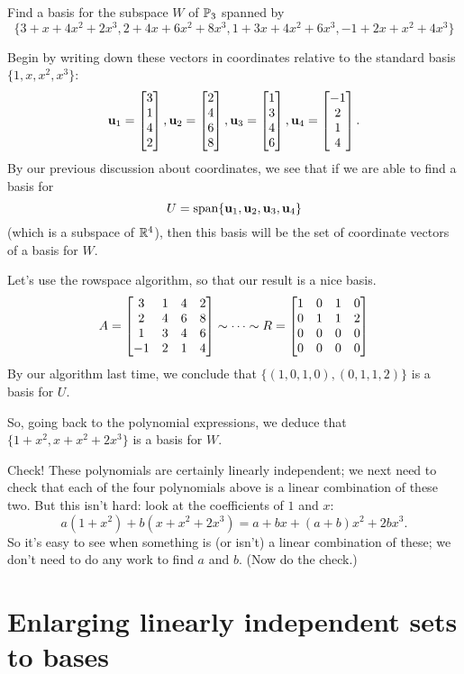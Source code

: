 \begin{myprob} Find a basis for the subspace $W$ of $\mathbb{P}_3$ spanned by
$$
\{ 3+x+4x^2+2x^3, 2+4x+6x^2+8x^3, 1+3x+4x^2+6x^3, -1+2x +x^2 + 4x^3\}
$$

\begin{mysol} Begin by writing down these vectors in coordinates relative to
the standard basis $\{1,x,x^2,x^3\}$:
$$
\mathbf{u}_1 = \left[ \begin{matrix} 3\\1\\4\\2 \end{matrix} \right], \mathbf{u}_2=\left[ \begin{matrix} 2\\4\\6\\8 \end{matrix} \right], \mathbf{u}_3=\left[ \begin{matrix} 1\\3\\4\\6 \end{matrix} \right], \mathbf{u}_4=\left[ \begin{matrix} -1\\2\\1\\4 \end{matrix} \right].
$$
By our previous discussion about coordinates, we see that if we are able to 
find a basis for 
$$
U = \textrm{span}\{ \mathbf{u}_1, \mathbf{u}_2,\mathbf{u}_3,\mathbf{u}_4\}
$$
(which is a subspace of $\mathbb{R}^4$), then this basis will be the set of coordinate
vectors of a basis for $W$.

Let's use the rowspace algorithm, so that our result is a nice basis.
$$
A = \left[ \begin{matrix} 
3&1&4&2\\
2&4&6&8\\
1&3&4&6\\
-1&2&1&4 \end{matrix} \right] \sim \cdots \sim R= \left[ \begin{matrix} 1&0&1&0\\0&1&1&2\\0&0&0&0\\0&0&0&0 \end{matrix} \right]
$$
By our algorithm last time, we conclude that $\{ (1,0,1,0), (0,1,1,2)\}$
is a basis for $U$.

So, going back to the polynomial expressions,  we deduce that $\{ 1+x^2, x+x^2+2x^3\}$ is a basis for $W$.

Check!  These polynomials are certainly linearly independent; we next
need to check that each of the four polynomials above is a linear combination
of these two.  But this isn't hard:  look at the coefficients of $1$ and
$x$:
$$
a(1+x^2) + b(x+x^2+2x^3) = a + bx + (a+b)x^2 + 2bx^3.
$$
So it's easy to see when something is (or isn't) a linear combination
of these; we don't need to do any work to find $a$ and $b$. (Now do the
check.)
\end{mysol}\end{myprob}

\section{Enlarging linearly independent sets to bases}

